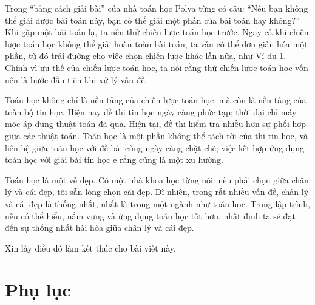 \documentclass[11pt]{article}
\begin{document}
Trong ``bảng cách giải bài'' của nhà toán học Polya từng có câu: ``Nếu bạn
không thể giải được bài toán này, bạn có thể giải một phần của bài toán hay
không?'' Khi gặp một bài toán lạ, ta nên thử chiến lược toán học trước. Ngay
cả khi chiến lược toán học không thể giải hoàn toàn bài toán, ta vẫn có thể
đơn giản hóa một phần, từ đó trải đường cho việc chọn chiến lược khác lần
nữa, như Ví dụ 1. Chính vì ưu thế của chiến lược toán học, ta nói rằng thử
chiến lược toán học vốn nên là bước đầu tiên khi xử lý vấn đề.

Toán học không chỉ là nền tảng của chiến lược toán học, mà còn là nền tảng
của toàn bộ tin học. Hiện nay đề thi tin học ngày càng phức tạp; thời đại chỉ
máy móc áp dụng thuật toán đã qua. Hiện tại, đề thi kiểm tra nhiều hơn sự
phối hợp giữa các thuật toán. Toán học là một phần không thể tách rời của thi
tin học, và liên hệ giữa toán học với đề bài cũng ngày càng chặt chẽ; việc
kết hợp ứng dụng toán học với giải bài tin học e rằng cũng là một xu hướng.

Toán học là một vẻ đẹp. Có một nhà khoa học từng nói: nếu phải chọn giữa chân
lý và cái đẹp, tôi sẵn lòng chọn cái đẹp. Dĩ nhiên, trong rất nhiều vấn đề,
chân lý và cái đẹp là thống nhất, nhất là trong một ngành như toán học. Trong
lập trình, nếu có thể hiểu, nắm vững và ứng dụng toán học tốt hơn, nhất định
ta sẽ đạt đến sự thống nhất hài hòa giữa chân lý và cái đẹp.

Xin lấy điều đó làm kết thúc cho bài viết này.

\appendix
\section{Phụ lục}
\label{app:notes}
\end{document}
